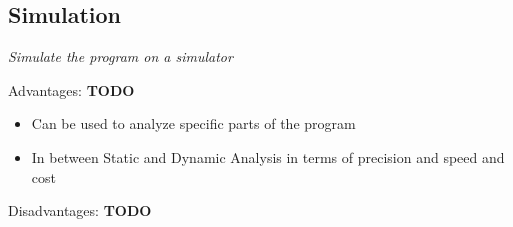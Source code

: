\subsection{Simulation}\label{sec:simulation}
\textit{Simulate the program on a simulator}

Advantages:
\textbf{TODO}
\begin{itemize}
  \item Can be used to analyze specific parts of the program
  \item In between Static and Dynamic Analysis in terms of precision and speed and cost
\end{itemize}
Disadvantages:
\textbf{TODO}
